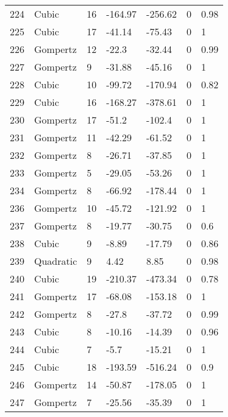 \documentclass[11pt]{article}
\begin{document}
\begin{center}
\begin{longtable}{lllllll}
    224 & Cubic     & 16              & -164.97 & -256.62 & 0       & 0.98 \\
    225 & Cubic     & 17              & -41.14  & -75.43  & 0       & 1    \\
    226 & Gompertz  & 12              & -22.3   & -32.44  & 0       & 0.99 \\
    227 & Gompertz  & 9               & -31.88  & -45.16  & 0       & 1    \\
    228 & Cubic     & 10              & -99.72  & -170.94 & 0       & 0.82 \\
    229 & Cubic     & 16              & -168.27 & -378.61 & 0       & 1    \\
    230 & Gompertz  & 17              & -51.2   & -102.4  & 0       & 1    \\
    231 & Gompertz  & 11              & -42.29  & -61.52  & 0       & 1    \\
    232 & Gompertz  & 8               & -26.71  & -37.85  & 0       & 1    \\
    233 & Gompertz  & 5               & -29.05  & -53.26  & 0       & 1    \\
    234 & Gompertz  & 8               & -66.92  & -178.44 & 0       & 1    \\
    236 & Gompertz  & 10              & -45.72  & -121.92 & 0       & 1    \\
    237 & Gompertz  & 8               & -19.77  & -30.75  & 0       & 0.6  \\
    238 & Cubic     & 9               & -8.89   & -17.79  & 0       & 0.86 \\
    239 & Quadratic & 9               & 4.42    & 8.85    & 0       & 0.98 \\
    240 & Cubic     & 19              & -210.37 & -473.34 & 0       & 0.78 \\
    241 & Gompertz  & 17              & -68.08  & -153.18 & 0       & 1    \\
    242 & Gompertz  & 8               & -27.8   & -37.72  & 0       & 0.99 \\
    243 & Cubic     & 8               & -10.16  & -14.39  & 0       & 0.96 \\
    244 & Cubic     & 7               & -5.7    & -15.21  & 0       & 1    \\
    245 & Cubic     & 18              & -193.59 & -516.24 & 0       & 0.9  \\
    246 & Gompertz  & 14              & -50.87  & -178.05 & 0       & 1    \\
    247 & Gompertz  & 7               & -25.56  & -35.39  & 0       & 1    \\

\end{longtable}
\end{center}
\end{document}
